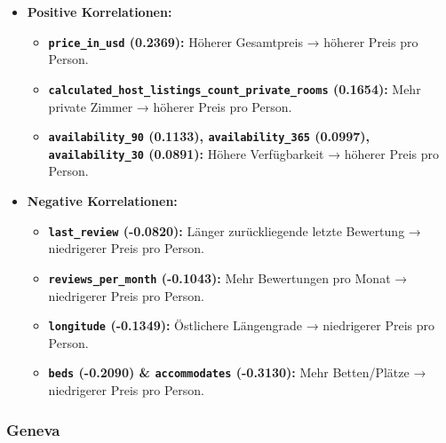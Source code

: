 \documentclass[
  journal,
]{IEEEtran}%
\providecommand{\tightlist}{%
  \setlength{\itemsep}{0pt}\setlength{\parskip}{0pt}}\usepackage{longtable,booktabs,array}
\begin{document}
\begin{itemize}
\item
  \textbf{Positive Korrelationen:}

  \begin{itemize}
  \tightlist
  \item
    \textbf{\texttt{price\_in\_usd} (0.2369):} Höherer Gesamtpreis →
    höherer Preis pro Person.
  \item
    \textbf{\texttt{calculated\_host\_listings\_count\_private\_rooms}
    (0.1654):} Mehr private Zimmer → höherer Preis pro Person.
  \item
    \textbf{\texttt{availability\_90} (0.1133),
    \texttt{availability\_365} (0.0997), \texttt{availability\_30}
    (0.0891):} Höhere Verfügbarkeit → höherer Preis pro Person.
  \end{itemize}
\item
  \textbf{Negative Korrelationen:}

  \begin{itemize}
  \tightlist
  \item
    \textbf{\texttt{last\_review} (-0.0820):} Länger zurückliegende
    letzte Bewertung → niedrigerer Preis pro Person.
  \item
    \textbf{\texttt{reviews\_per\_month} (-0.1043):} Mehr Bewertungen
    pro Monat → niedrigerer Preis pro Person.
  \item
    \textbf{\texttt{longitude} (-0.1349):} Östlichere Längengrade →
    niedrigerer Preis pro Person.
  \item
    \textbf{\texttt{beds} (-0.2090) \& \texttt{accommodates} (-0.3130):}
    Mehr Betten/Plätze → niedrigerer Preis pro Person.
  \end{itemize}
\end{itemize}

\subsubsection{Geneva}\label{geneva}
\end{document}
